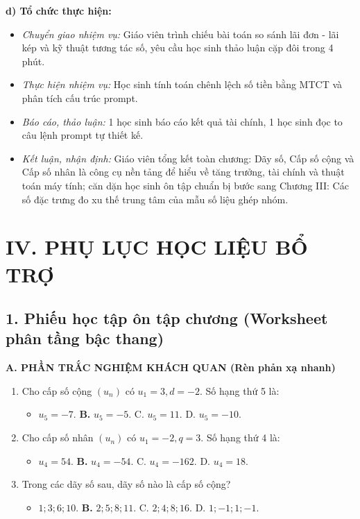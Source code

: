 \documentclass[12pt, a4paper]{article}
\begin{document}
\noindent \textbf{d) Tổ chức thực hiện:}
\begin{itemize}[leftmargin=0.8cm]
    \item \textit{Chuyển giao nhiệm vụ:} Giáo viên trình chiếu bài toán so sánh lãi đơn - lãi kép và kỹ thuật tương tác số, yêu cầu học sinh thảo luận cặp đôi trong 4 phút.
    \item \textit{Thực hiện nhiệm vụ:} Học sinh tính toán chênh lệch số tiền bằng MTCT và phân tích cấu trúc prompt.
    \item \textit{Báo cáo, thảo luận:} 1 học sinh báo cáo kết quả tài chính, 1 học sinh đọc to câu lệnh prompt tự thiết kế.
    \item \textit{Kết luận, nhận định:} Giáo viên tổng kết toàn chương: Dãy số, Cấp số cộng và Cấp số nhân là công cụ nền tảng để hiểu về tăng trưởng, tài chính và thuật toán máy tính; căn dặn học sinh ôn tập chuẩn bị bước sang Chương III: Các số đặc trưng đo xu thế trung tâm của mẫu số liệu ghép nhóm.
\end{itemize}

\section*{IV. PHỤ LỤC HỌC LIỆU BỔ TRỢ}

\subsection*{1. Phiếu học tập ôn tập chương (Worksheet phân tầng bậc thang)}

\noindent \textbf{A. PHẦN TRẮC NGHIỆM KHÁCH QUAN (Rèn phản xạ nhanh)}
\begin{enumerate}[leftmargin=0.6cm]
    \item Cho cấp số cộng $(u_n)$ có $u_1 = 3, d = -2$. Số hạng thứ 5 là:
    \begin{itemize}[leftmargin=0.6cm]
        \item[A.] $u_5 = -7$. \quad \textbf{B.} $u_5 = -5$. \quad C. $u_5 = 11$. \quad D. $u_5 = -10$.
    \end{itemize}
    \item Cho cấp số nhân $(u_n)$ có $u_1 = -2, q = 3$. Số hạng thứ 4 là:
    \begin{itemize}[leftmargin=0.6cm]
        \item[A.] $u_4 = 54$. \quad \textbf{B.} $u_4 = -54$. \quad C. $u_4 = -162$. \quad D. $u_4 = 18$.
    \end{itemize}
    \item Trong các dãy số sau, dãy số nào là cấp số cộng?
    \begin{itemize}[leftmargin=0.6cm]
        \item[A.] $1; 3; 6; 10$. \quad \textbf{B.} $2; 5; 8; 11$. \quad C. $2; 4; 8; 16$. \quad D. $1; -1; 1; -1$.
    \end{itemize}
\end{enumerate}
\end{document}
